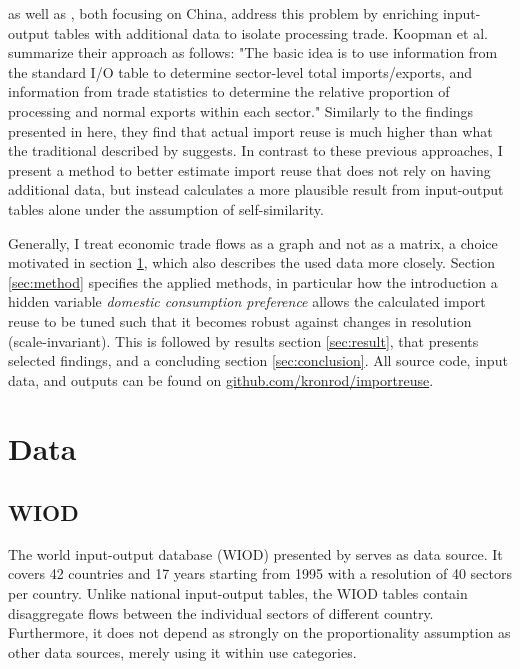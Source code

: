 \documentclass[english]{uzhpub}
\begin{document}
\cite{koopman2012tracing} as well as \cite{kee2013domestic}, both focusing on China, address this problem by enriching input-output tables with additional data to isolate processing trade. Koopman et al. summarize their approach as follows: "The basic idea is to use information from the standard I/O table to determine sector-level total imports/exports, and information from trade statistics to determine the relative proportion of processing and normal exports within each sector." Similarly to the findings presented in here, they find that actual import reuse is much higher than what the traditional described by \cite{hummels2001nature} suggests. In contrast to these previous approaches, I present a method to better estimate import reuse that does not rely on having additional data, but instead calculates a more plausible result from input-output tables alone under the assumption of self-similarity.

Generally, I treat economic trade flows as a graph and not as a matrix, a choice motivated in section \ref{sec:data}, which also describes the used data more closely. Section \ref{sec:method} specifies the applied methods, in particular how the introduction a hidden variable \emph{domestic consumption preference} allows the calculated import reuse to be tuned such that it becomes robust against changes in resolution (scale-invariant). This is followed by results section \ref{sec:result}, that presents selected findings, and a concluding section \ref{sec:conclusion}. All source code, input data, and outputs can be found on \href{https://github.com/kronrod/importreuse}{github.com/kronrod/importreuse}.

\section{Data}
\label{sec:data}
\subsection{WIOD}
The world input-output database (WIOD) presented by \cite{timmer2012world} serves as data source. It covers 42 countries and 17 years starting from 1995 with a resolution of 40 sectors per country. Unlike national input-output tables, the WIOD tables contain disaggregate flows between the individual sectors of different country. Furthermore, it does not depend as strongly on the proportionality assumption as other data sources, merely using it within use categories.
\end{document}
